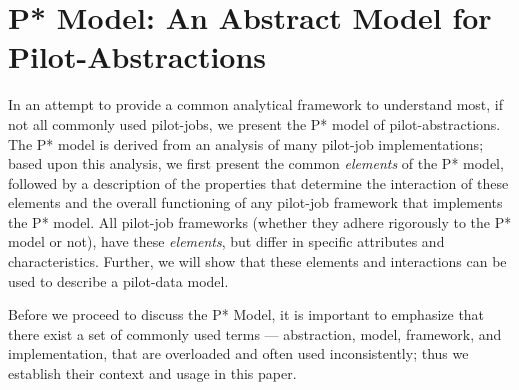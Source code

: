 \documentclass[conference,final]{IEEEtran}
\newcommand{\jhanote}[1]{ {\textcolor{red} { ***shantenu: #1 }}}
\newcommand{\jhanote}[1]{}
\newcommand{\upp}{\vspace*{-0.5em}}
\begin{document}




\section{P* Model: An Abstract Model for Pilot-Abstractions\upp\upp}
\label{sec:pilot-model}

In an attempt to provide a common analytical framework to understand
most, if not all commonly used pilot-jobs, we present the P* model of
pilot-abstractions. The P* model is derived from an analysis of many
pilot-job implementations; based upon this analysis, we first present
the common {\it elements} of the P* model, followed by a description
of the properties that determine the interaction of these elements and
the overall functioning of any pilot-job framework that implements the
P* model. All pilot-job frameworks (whether they adhere rigorously to
the P* model or not), have these {\it elements}, but differ in
specific attributes and characteristics.  Further, we will show that
these elements and interactions can be used to describe a pilot-data
model.
 
Before we proceed to discuss the P* Model, it is important to
emphasize that there exist a set of commonly used terms ---
abstraction, model, framework, and implementation, that are overloaded
and often used inconsistently; thus we establish their context and
usage in this paper.
\end{document}
